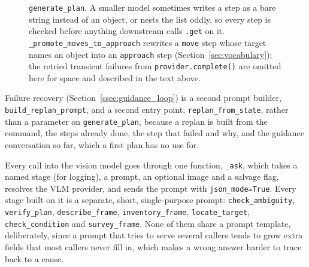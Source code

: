\begin{figure}[htbp]
  \centering
  \caption{\texttt{generate\_plan}. A smaller model sometimes writes a step as a bare string instead of an object, or nests the list oddly, so every step is checked before anything downstream calls \texttt{.get} on it. \texttt{\_promote\_moves\_to\_approach} rewrites a \texttt{move} step whose target names an object into an \texttt{approach} step (Section~\ref{sec:vocabulary}); the retried transient failures from \texttt{provider.complete()} are omitted here for space and described in the text above.}
  \label{fig:flow-planner}
\end{figure}

Failure recovery (Section~\ref{ssec:guidance_loop}) is a second prompt
builder, \texttt{build\_replan\_prompt}, and a second entry point,
\texttt{replan\_from\_state}, rather than a parameter on
\texttt{generate\_plan}, because a replan is built from the command, the
steps already done, the step that failed and why, and the guidance
conversation so far, which a first plan has no use for.

\label{sec:vlm}

Every call into the vision model goes through one function, \texttt{\_ask},
which takes a named stage (for logging), a prompt, an optional image and a
salvage flag, resolves the VLM provider, and sends the prompt with
\texttt{json\_mode=True}. Every stage built on it is a separate, short,
single-purpose prompt: \texttt{check\_ambiguity}, \texttt{verify\_plan},
\texttt{describe\_frame}, \texttt{inventory\_frame}, \texttt{locate\_target},
\texttt{check\_condition} and \texttt{survey\_frame}. None of them share a
prompt template, deliberately, since a prompt that tries to serve several
callers tends to grow extra fields that most callers never fill in, which
makes a wrong answer harder to trace back to a cause.

